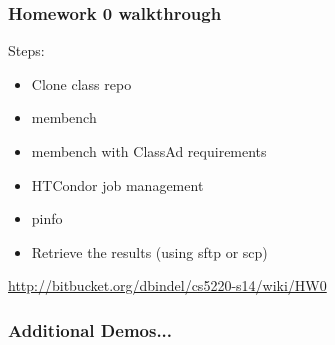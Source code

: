 \documentclass{beamer}
\begin{document}
\begin{frame}
  \frametitle{Homework 0 walkthrough}
  
  Steps:\\
  \vspace{5mm}
  \begin{itemize}
  \item Clone class repo
  \vspace{5mm}
  \item membench
  \vspace{5mm}
  \item membench with ClassAd requirements
  \vspace{5mm}
  \item HTCondor job management
  \vspace{5mm}
  \item pinfo
  \vspace{5mm}
  \item Retrieve the results (using sftp or scp)
  \end{itemize}
  \small \url{http://bitbucket.org/dbindel/cs5220-s14/wiki/HW0}
\end{frame}

\begin{frame}
  \frametitle{Additional Demos...}

\end{frame}
\end{document}
